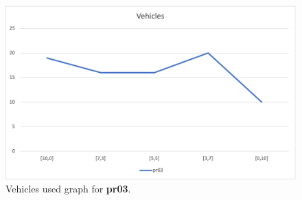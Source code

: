 \begin{figure}[H]
    \centering
    \includegraphics[height=0.25\textheight]{../graphs/pr03-vehicles.png}
    \caption{Vehicles used graph for \textbf{pr03}.}
\end{figure}

\newpage